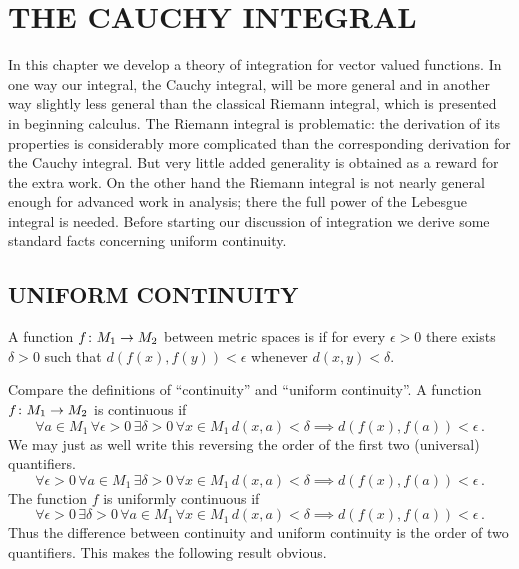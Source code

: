 \chapter{THE CAUCHY INTEGRAL}\label{C_int}

In this chapter we develop a theory of integration for vector valued functions.  In one way
our integral, the Cauchy integral, will be more general and in another way slightly less
general than the classical Riemann integral, which is presented in beginning calculus.  The
Riemann integral is problematic: the derivation of its properties is considerably more
complicated than the corresponding  derivation for the Cauchy integral.  But very little added
generality is obtained as a reward for the extra work.  On the other hand the Riemann integral
is not nearly general enough for advanced work in analysis; there the full power of the
Lebesgue integral is needed.  Before starting our discussion of integration we derive some
standard facts concerning uniform continuity.

\section{UNIFORM CONTINUITY}

\begin{defn}  A function $f \colon M_1 \rightarrow M_2$ between metric spaces is
 if for every $\epsilon > 0$ there exists $\delta > 0$ such that
$d(f(x),f(y)) < \epsilon$ whenever $d(x,y) < \delta$.
\end{defn}

Compare the definitions of ``continuity'' and ``uniform continuity''.  A function $f\colon M_1
\rightarrow M_2$ is continuous if
  \[ \forall a \in M_1\,   \forall \epsilon > 0\,
             \exists \delta > 0 \, \forall x \in M_1 \,
                     d(x,a) < \delta \implies d(f(x),f(a)) < \epsilon\,. \]
We may just as well write this reversing the order of the first two (universal) quantifiers.
  \[ \forall \epsilon > 0\, \forall a \in M_1\,
             \exists \delta > 0 \,  \forall x \in M_1\,
                     d(x,a) < \delta \implies d(f(x),f(a)) < \epsilon\,. \]
The function $f$ is uniformly continuous if
  \[ \forall \epsilon > 0\,  \exists \delta > 0 \,
             \forall a \in M_1\,     \forall x \in M_1\,
                     d(x,a) < \delta  \implies d(f(x),f(a)) < \epsilon\,. \]
Thus the difference between continuity and uniform continuity is the order of two quantifiers.
This makes the following result obvious.

